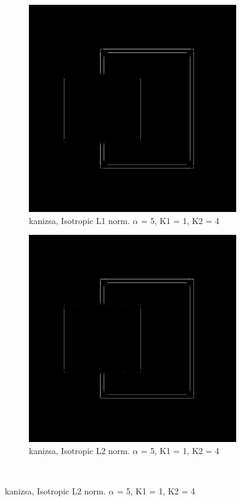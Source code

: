 \begin{figure}[H]
\centering

  \begin{subfigure}{.7\textwidth}
    \centering
    \includegraphics[width=.9\textwidth]{./canny/kanizsa_L1_a5_k11_k24}
    \caption{kanizsa, Isotropic L1 norm. $\alpha$ = 5, K1 = 1, K2 = 4}
    \label{fig:kanizsa_L1_a5_k11_k24}
  \end{subfigure}%
  
  \begin{subfigure}{.7\textwidth}
    \centering
    \includegraphics[width=.9\textwidth]{./canny/kanizsa_L2_a5_k11_k24}
    \caption{kanizsa, Isotropic L2 norm. $\alpha$ = 5, K1 = 1, K2 = 4}
    \label{fig:kanizsa_L2_a5_k11_k24}
  \end{subfigure}\\%
 \end{figure}

